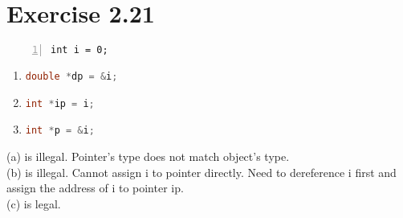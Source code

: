 \documentclass{article}
\begin{document}
\section*{Exercise 2.21}

\begin{lstlisting}[basicstyle=\ttfamily, numbers=left, xleftmargin=2em]
int i = 0;
\end{lstlisting}

\begin{enumerate}[label=(\alph*)]
    \item \lstinline[language=C++]|double *dp = &i;|
    \item \lstinline[language=C++]|int *ip = i;|
    \item \lstinline[language=C++]|int *p = &i;|
\end{enumerate}

\begin{flushleft}
(a) is illegal. Pointer's type does not match object's type.\\
(b) is illegal. Cannot assign i to pointer directly. Need to dereference i first and assign the address of i to pointer ip.\\
(c) is legal.
\end{flushleft}
\end{document}
